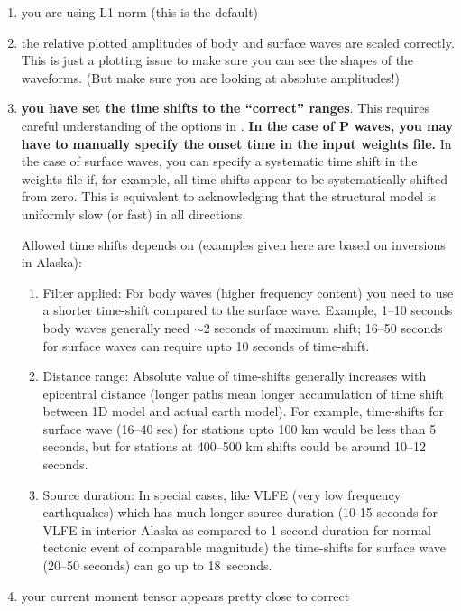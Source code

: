 \begin{enumerate}
\begin{enumerate}
\item you are using L1 norm (this is the default)

\item the relative plotted amplitudes of body and surface waves are scaled correctly. This is just a plotting issue to make sure you can see the shapes of the waveforms. (But make sure you are looking at absolute amplitudes!)

\item {\bf you have set the time shifts to the ``correct'' ranges}. This requires careful understanding of the options in . {\bf In the case of P waves, you may have to manually specify the onset time in the input weights file.}
In the case of surface waves, you can specify a systematic time shift in the weights file if, for example, all time shifts appear to be systematically shifted from zero. This is equivalent to acknowledging that the structural model is uniformly slow (or fast) in all directions.

Allowed time shifts depends on (examples given here are based on inversions in Alaska):
%
\begin{enumerate}
\item Filter applied: For body waves (higher frequency content) you need to use a shorter time-shift compared to the surface wave. Example, 1--10 seconds body waves generally need $\sim$2 seconds of maximum shift; 16--50 seconds for surface waves can require upto 10 seconds of time-shift.

\item Distance range: Absolute value of time-shifts generally increases with epicentral distance (longer paths mean longer accumulation of time shift between 1D model and actual earth model). For example, time-shifts for surface wave (16--40 sec) for stations upto 100 km would be less than 5 seconds, but for stations at 400--500 km shifts could be around 10--12 seconds.

\item Source duration: In special cases, like VLFE (very low frequency earthquakes) which has much longer source duration (10-15 seconds for  VLFE in interior Alaska as compared to 1 second duration for normal tectonic event of comparable magnitude) the time-shifts for surface wave (20--50 seconds) can go up to 18~seconds.
\end{enumerate}

\label{item:tshift}

\item your current moment tensor appears pretty close to correct


\end{enumerate}
\end{enumerate}

